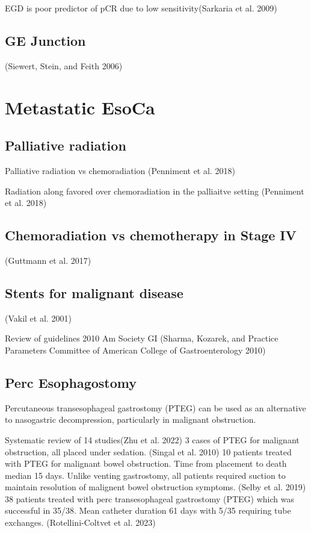 \documentclass[
  letterpaper,
]{scrbook}
\begin{document}
EGD is poor predictor of pCR due to low sensitivity(Sarkaria et al.
2009)

\section{GE Junction}\label{ge-junction}

(Siewert, Stein, and Feith 2006)

\chapter{Metastatic EsoCa}\label{eso_metastatic}

\section{Palliative radiation}\label{palliative-radiation}

Palliative radiation vs chemoradiation (Penniment et al. 2018)

Radiation along favored over chemoradiation in the palliaitve setting
(Penniment et al. 2018)

\section{Chemoradiation vs chemotherapy in Stage
IV}\label{chemoradiation-vs-chemotherapy-in-stage-iv}

(Guttmann et al. 2017)

\section{Stents for malignant
disease}\label{stents-for-malignant-disease}

(Vakil et al. 2001)

Review of guidelines 2010 Am Society GI (Sharma, Kozarek, and Practice
Parameters Committee of American College of Gastroenterology 2010)

\section{Perc Esophagostomy}\label{perc-esophagostomy}

Percutaneous transesophageal gastrostomy (PTEG) can be used as an
alternative to nasogastric decompression, particularly in malignant
obstruction.

Systematic review of 14 studies(Zhu et al. 2022) 3 cases of PTEG for
malignant obstruction, all placed under sedation. (Singal et al. 2010)
10 patients treated with PTEG for malignant bowel obstruction. Time from
placement to death median 15 days. Unlike venting gastrostomy, all
patients required suction to maintain resolution of malignent bowel
obstruction symptoms. (Selby et al. 2019) 38 patients treated with perc
transesophageal gastrostomy (PTEG) which was successful in 35/38. Mean
catheter duration 61 days with 5/35 requiring tube exchanges.
(Rotellini-Coltvet et al. 2023)
\end{document}
